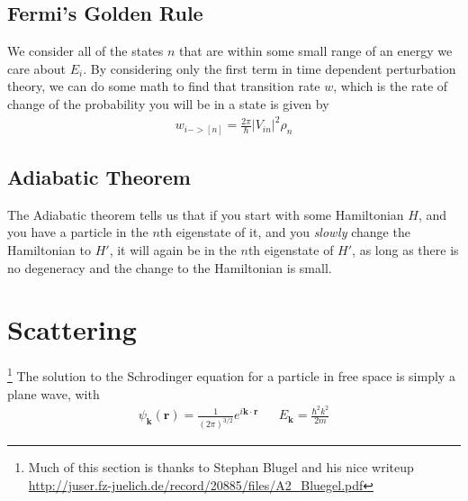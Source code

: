 \subsection{Fermi's Golden Rule}
We consider all of the states $n$ that are within some small range of an energy we care about $E_i$. By considering only the first term in time dependent perturbation theory, we can do some math to find that transition rate $w$, which is the rate of change of the probability you will be in a state is given by
\begin{align}
    w_{i->[n]} = \frac{2\pi}{\hbar} |V_{in}|^2\rho_n
\end{align}


\subsection{Adiabatic Theorem}
The Adiabatic theorem tells us that if you start with some Hamiltonian $H$, and you have a particle in the $n$th eigenstate of it, and you \emph{slowly} change the Hamiltonian to $H'$, it will again be in the $n$th eigenstate of $H'$, as long as there is no degeneracy and the change to the Hamiltonian is small.


\section{Scattering}\footnote{Much of this section is thanks to Stephan Blugel and his nice writeup \url{http://juser.fz-juelich.de/record/20885/files/A2_Bluegel.pdf}}
The solution to the Schrodinger equation for a particle in free space is simply a plane wave, with
\begin{align}
\psi_\textbf{k}(\textbf{r}) = \frac{1}{(2\pi)^{3/2}}e^{i\textbf{k}\cdot\textbf{r}}&& E_\textbf{k} = \frac{\hbar^2k^2}{2m}
\end{align}

